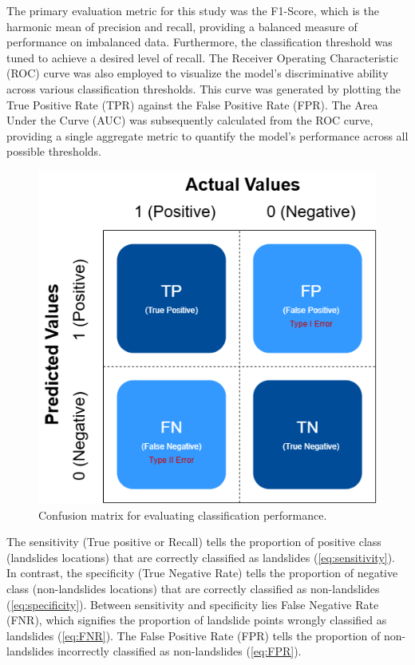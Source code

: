 The primary evaluation metric for this study was the F1-Score, which is the harmonic mean of precision and recall, providing a balanced measure of performance on imbalanced data. Furthermore, the classification threshold was tuned to achieve a desired level of recall. The Receiver Operating Characteristic (ROC) curve was also employed to visualize the model's discriminative ability across various classification thresholds. This curve was generated by plotting the True Positive Rate (TPR) against the False Positive Rate (FPR). The Area Under the Curve (AUC) was subsequently calculated from the ROC curve, providing a single aggregate metric to quantify the model's performance across all possible thresholds.
\begin{figure}[H]
    \centerline{\includegraphics[width=\linewidth]{fig5.png}}
    \caption{Confusion matrix for evaluating classification performance.}
    \label{fig}
\end{figure}

The sensitivity (True positive or Recall) tells the proportion of positive class (landslides locations) that are correctly classified as landslides (\ref{eq:sensitivity}). In contrast, the specificity (True Negative Rate) tells the proportion of negative class (non-landslides locations) that are correctly classified as non-landslides (\ref{eq:specificity}). Between sensitivity and specificity lies False Negative Rate (FNR), which signifies the proportion of landslide points wrongly classified as landslides (\ref{eq:FNR}). The False Positive Rate (FPR) tells the proportion of non-landslides incorrectly classified as non-landslides (\ref{eq:FPR}).


